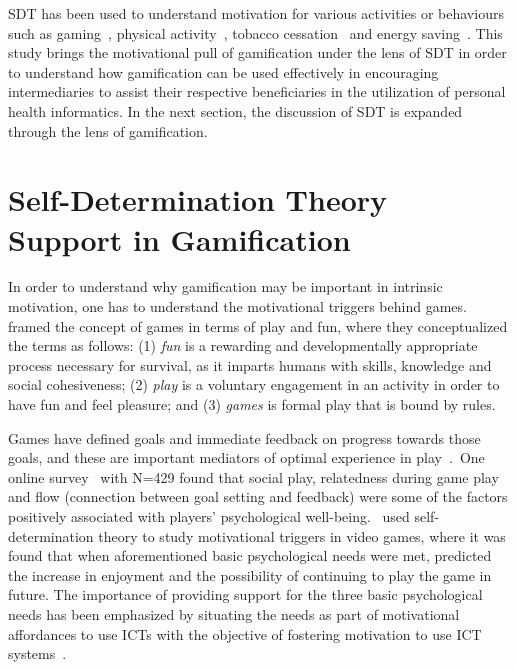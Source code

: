 SDT has been used to understand motivation for various activities or behaviours such as gaming~\citep{ryan2006:motivationalpull}, physical activity~\citep{power2011:obesity}, tobacco cessation~\citep{williams2006:testing} and energy saving~\citep{webb2013:self}. This study brings the motivational pull of gamification under the lens of SDT in order to understand how gamification can be used effectively in encouraging intermediaries to assist their respective beneficiaries in the utilization of personal health informatics. In the next section, the discussion of SDT is expanded through the lens of gamification.
\section{Self-Determination Theory Support in Gamification}
In order to understand why gamification may be important in intrinsic motivation, one has to understand the motivational triggers behind games.~\cite{knaving2013designing} framed the concept of games in terms of play and fun, where they conceptualized the terms as follows: (1) \emph{fun} is a rewarding and developmentally appropriate process necessary for survival, as it imparts humans with skills, knowledge and social cohesiveness; (2) \emph{play} is a voluntary engagement in an activity in order to have fun and feel pleasure; and (3) \emph{games} is formal play that is bound by rules. 

Games have defined goals and immediate feedback on progress towards those goals, and these are important mediators of optimal experience in play~\citep{knaving2013designing}.~One online survey~\citep{vella2013positively} with N=429 found that social play, relatedness during game play and flow (connection between goal setting and feedback) were some of the factors positively associated with players' psychological well-being.~\cite{ryan2006:motivationalpull} used self-determination theory to study motivational triggers in video games, where it was found that when aforementioned basic psychological needs were met, predicted the increase in enjoyment and the possibility of continuing to play the game in future. The importance of providing support for the three basic psychological needs has been emphasized  by situating the needs as part of motivational affordances to use ICTs with the objective of fostering motivation to use ICT systems~\citep{zhang2008motivational}. 

